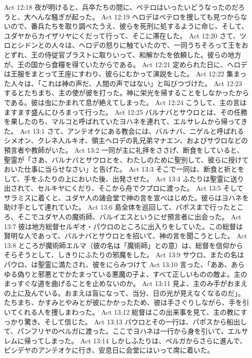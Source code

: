 Act 12:18  夜が明けると、兵卒たちの間に、ペテロはいったいどうなったのだろうと、大へんな騒ぎが起った。
Act 12:19  ヘロデはペテロを捜しても見つからないので、番兵たちを取り調べたうえ、彼らを死刑に処するように命じ、そして、ユダヤからカイザリヤにくだって行って、そこに滞在した。
Act 12:20  さて、ツロとシドンとの人々は、ヘロデの怒りに触ていたので、一同うちそろって王をおとずれ、王の侍従官ブラストに取りいって、和解かたを依頼した。彼らの地方が、王の国から食糧を得ていたからである。
Act 12:21  定められた日に、ヘロデは王服をまとって王座にすわり、彼らにむかって演説をした。
Act 12:22  集まった人々は、「これは神の声だ、人間の声ではない」と叫びつづけた。
Act 12:23  するとたちまち、主の使が彼を打った。神に栄光を帰することをしなかったからである。彼は虫にかまれて息が絶えてしまった。
Act 12:24  こうして、主の言はますます盛んにひろまって行った。
Act 12:25  バルナバとサウロとは、その任務を果したのち、マルコと呼ばれていたヨハネを連れて、エルサレムから帰ってきた。
Act 13:1  さて、アンテオケにある教会には、バルナバ、ニゲルと呼ばれるシメオン、クレネ人ルキオ、領主ヘロデの乳兄弟マナエン、およびサウロなどの預言者や教師がいた。
Act 13:2  一同が主に礼拝をささげ、断食をしていると、聖霊が「さあ、バルナバとサウロとを、わたしのために聖別して、彼らに授けておいた仕事に当らせなさい」と告げた。
Act 13:3  そこで一同は、断食と祈とをして、手をふたりの上においた後、出発させた。
Act 13:4  ふたりは聖霊に送り出されて、セルキヤにくだり、そこから舟でクプロに渡った。
Act 13:5  そしてサラミスに着くと、ユダヤ人の諸会堂で神の言を宣べはじめた。彼らはヨハネを助け手として連れていた。
Act 13:6  島全体を巡回して、パポスまで行ったところ、そこでユダヤ人の魔術師、バルイエスというにせ預言者に出会った。
Act 13:7  彼は地方総督セルギオ・パウロのところに出入りをしていた。この総督は賢明な人であって、バルナバとサウロとを招いて、神の言を聞こうとした。
Act 13:8  ところが魔術師エルマ（彼の名は「魔術師」との意）は、総督を信仰からそらそうとして、しきりにふたりの邪魔をした。
Act 13:9  サウロ、またの名はパウロ、は聖霊に満たされ、彼をにらみつけて
Act 13:10  言った、「ああ、あらゆる偽りと邪悪とでかたまっている悪魔の子よ、すべて正しいものの敵よ。主のまっすぐな道を曲げることを止めないのか。
Act 13:11  見よ、主のみ手がおまえの上に及んでいる。おまえは盲になって、当分、日の光が見えなくなるのだ」。たちまち、かすみとやみとが彼にかかったため、彼は手さぐりしながら、手を引いてくれる人を捜しまわった。
Act 13:12  総督はこの出来事を見て、主の教にすっかり驚き、そして信じた。
Act 13:13  パウロとその一行は、パポスから船出して、パンフリヤのペルガに渡った。ここでヨハネは一行から身を引いて、エルサレムに帰ってしまった。
Act 13:14  しかしふたりは、ペルガからさらに進んで、ピシデヤのアンテオケに行き、安息日に会堂にはいって席に着いた。
